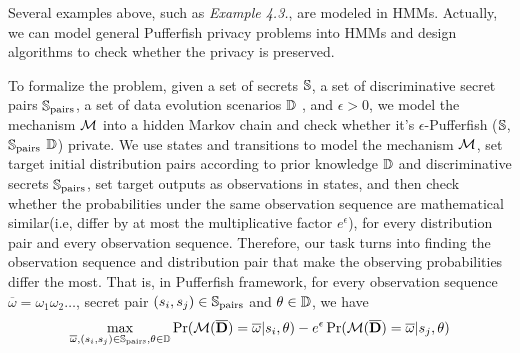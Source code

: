 \iffalse
Actually, we formulate the above Pufferfish privacy cases into Hidden Markov Models.
For instance, in \textit{Example 3}, the state space consists of ($0, 1, 2, \underline{0}, \underline{1}, \underline{2}$).
The states $\underline{0}$, $\underline{1}$ and $\underline{2}$ emit, with certainty,
observation $\textit{zero}$, $\textit{one}$ and $\textit{two}$ respectively.
Even though the attacker has the prior knowledge that the disease is contagious,
we want to make sure that he won't infer whether any member in the data set
has contracted the disease or not. Thus the initial distribution pair the attacker gets would be
($1,0,0,0,0,0$) and ($0,0,1,0,0,0$). And since the probabilities of observing
$\textit{zero}$ are $\frac{2}{3}$ and $\frac{1}{6}$, this violates $\ln(2)$-Pufferfish privacy.
\fi

Several examples above, such as \textit{Example 4.3.}, are modeled in HMMs.
Actually, we can model general Pufferfish privacy problems into HMMs and
design algorithms to check whether the privacy is preserved.

To formalize the problem, given a set of secrets $\mathbb{S}$,
a set of discriminative secret pairs $\mathbb{S}_{\textmd{pairs}}$, a set of data evolution
scenarios $\mathbb{D}$ , and $\epsilon > 0$, we model the mechanism  $\mathcal{M}$ into a hidden Markov chain
and check whether it's $\epsilon$-Pufferfish ($\mathbb{S}$, $\mathbb{S}_{\textmd{pairs}}$
$\mathbb{D}$) private. We use states and transitions to model the mechanism $\mathcal{M}$,
set target initial distribution pairs according to prior knowledge $\mathbb{D}$ and discriminative secrets $\mathbb{S}_{\textmd{pairs}}$,
set target outputs as observations in states, and then check whether the probabilities under the same observation sequence
are mathematical similar(i.e, differ by at most the multiplicative factor $e^{\epsilon}$), for every distribution pair and every observation sequence.
Therefore, our task turns into finding the observation sequence and distribution pair that make the observing probabilities differ the most.
That is, in Pufferfish framework, for every observation sequence $\overline{\omega}=\omega_1\omega_2\ldots$, secret pair $(s_i, s_j) \in
\mathbb{S}_{\textmd{pairs}}$ and $\theta \in \mathbb{D}$, we have
  \begin{equation}\label{max1}
     \max_{\overline{\omega},(s_i, s_j) \in
    \mathbb{S}_{\textmd{pairs}},\theta \in \mathbb{D}}
    { \Pr (\mathcal{M} (\overline{\mathbf{D}}) = \overline{\omega}| s_i, \theta) - e^\epsilon \Pr (\mathcal{M} (\overline{\mathbf{D}}) = \overline{\omega}| s_j, \theta) }
  \end{equation}

